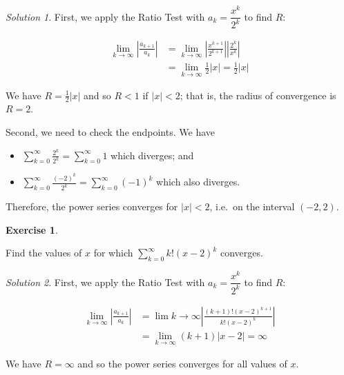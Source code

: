 \documentclass[
]{book}
\providecommand{\tightlist}{%
  \setlength{\itemsep}{0pt}\setlength{\parskip}{0pt}}
\theoremstyle{definition}
\theoremstyle{definition}
\theoremstyle{definition}
\newtheorem{exercise}{Exercise}[chapter]
\theoremstyle{definition}
\theoremstyle{remark}
\newtheorem*{solution}{Solution}
\begin{document}
\begin{solution}

First, we apply the Ratio Test with \(a_k= \dfrac{x^k}{2^k}\) to find \(R\):

\begin{align*}
\lim_{k\to\infty} \left | \frac{a_{k+1}}{a_k}\right | &= \lim_{k\to\infty}\left | \frac{x^{k+1}}{2^{k+1}} \right|\left | \frac{2^k}{x^k} \right| \\
&= \lim_{k\to\infty} \frac{1}{2}|x| = \frac{1}{2}|x|
\end{align*}

We have \(R=\frac{1}{2}|x|\) and so \(R<1\) if \(|x|<2\); that is, the radius of convergence is \(R=2\).

Second, we need to check the endpoints. We have

\begin{itemize}
\tightlist
\item
  \(\displaystyle \sum_{k=0}^\infty \frac{2^k}{2^k}=\sum_{k=0}^\infty 1\) which diverges; and
\item
  \(\displaystyle \sum_{k=0}^\infty \frac{(-2)^k}{2^k}=\sum_{k=0}^\infty (-1)^k\) which also diverges.
\end{itemize}

Therefore, the power series converges for \(|x|<2\), i.e.~on the interval \((-2,2)\).

\end{solution}

\begin{exercise}
\protect\hypertarget{exr:unlabeled-div-241}{}\label{exr:unlabeled-div-241}

Find the values of \(x\) for which \(\displaystyle \sum_{k=0}^\infty k!(x-2)^k\) converges.

\end{exercise}

\begin{solution}

First, we apply the Ratio Test with \(a_k= \dfrac{x^k}{2^k}\) to find \(R\):

\begin{align*}
\lim_{k\to\infty} \left | \frac{a_{k+1}}{a_k}\right | &= \lim{k\to\infty}\left | \frac{(k+1)!(x-2)^{k+1}}{k!(x-2)^k} \right | \\
&= \lim_{k\to\infty} (k+1)|x-2|=\infty
\end{align*}

We have \(R=\infty\) and so the power series converges for all values of \(x\).

\end{solution}
\end{document}
